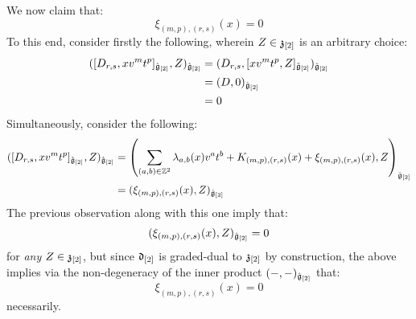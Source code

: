 \begin{remark}
\begin{enumerate}
                We now claim that:
                    $$\xi_{(m, p), (r, s)}(x) = 0$$
                To this end, consider firstly the following, wherein $Z \in \mathfrak{z}_{[2]}$ is an arbitrary choice:
                    $$
                        \begin{aligned}
                            ( [D_{r, s}, x v^m t^p]_{\hat{\mathfrak{g}}_{[2]}}, Z )_{\hat{\mathfrak{g}}_{[2]}} & = ( D_{r, s}, [x v^m t^p, Z]_{\tilde{\mathfrak{g}}_{[2]}} )_{\hat{\mathfrak{g}}_{[2]}}
                            \\
                            & = (D, 0)_{\hat{\mathfrak{g}}_{[2]}}
                            \\
                            & = 0
                        \end{aligned}
                    $$
                Simultaneously, consider the following:
                    $$
                        \begin{aligned}
                            ( [D_{r, s}, x v^m t^p]_{\hat{\mathfrak{g}}_{[2]}}, Z )_{\hat{\mathfrak{g}}_{[2]}} & = \left( \sum_{(a, b) \in \mathbb{Z}^2} \lambda_{a, b}(x) v^a t^b + K_{(m, p), (r, s)}(x) + \xi_{(m, p), (r, s)}(x), Z \right)_{\hat{\mathfrak{g}}_{[2]}}
                            \\
                            & = ( \xi_{(m, p), (r, s)}(x), Z )_{\hat{\mathfrak{g}}_{[2]}}
                        \end{aligned}
                    $$
                The previous observation along with this one imply that:
                    $$( \xi_{(m, p), (r, s)}(x), Z )_{\hat{\mathfrak{g}}_{[2]}} = 0$$
                for \textit{any} $Z \in \mathfrak{z}_{[2]}$, but since $\mathfrak{d}_{[2]}$ is graded-dual to $\mathfrak{z}_{[2]}$ by construction, the above implies via the non-degeneracy of the inner product $(-, -)_{\hat{\mathfrak{g}}_{[2]}}$ that:
                    $$\xi_{(m, p), (r, s)}(x) = 0$$
                necessarily. 


\end{enumerate}
\end{remark}
